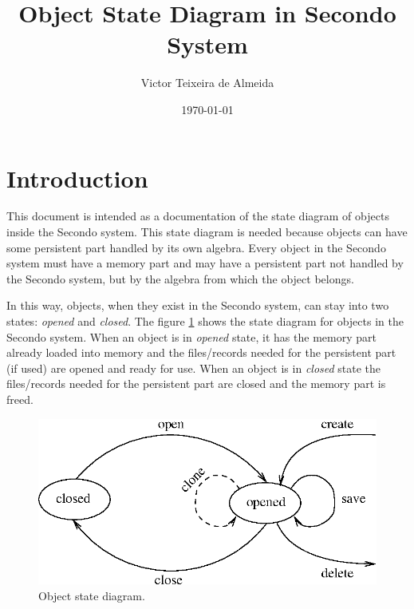 \documentclass [11pt, a4paper] {article}
\title{Object State Diagram in Secondo System}
\author{Victor Teixeira de Almeida }
\date{\today}
\begin{document}
\maketitle



\section{Introduction}
\label{sec:intro}

This document is intended as a documentation of the state diagram of objects inside the Secondo system. This state diagram is needed because objects can have some persistent part handled by its own algebra. Every object in the Secondo system must have a memory part and may have a persistent part not handled by the Secondo system, but by the algebra from which the object belongs. 

In this way, objects, when they exist in the Secondo system, can stay into two states: \emph{opened} and \emph{closed}. The figure \ref{fig:objstatediag} shows the state diagram for objects in the Secondo system. When an object is in \emph{opened} state, it has the memory part already loaded into memory and the files/records needed for the persistent part (if used) are opened and ready for use. When an object is in \emph{closed} state the files/records needed for the persistent part are closed and the memory part is freed. 

\begin{figure}[!hbp]
  \begin{center}
  \includegraphics{objstatediag.eps}
  \end{center}
  \caption{Object state diagram.}
  \label{fig:objstatediag}
\end{figure}
\end{document}
